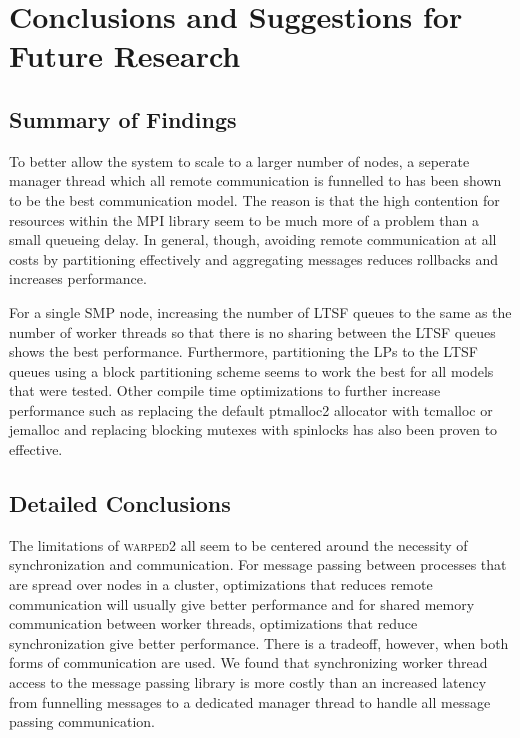 \documentclass[11pt]{book}
\begin{document}
\chapter[Conclusions \& Future Research]{Conclusions and Suggestions for Future Research}
\label{conclude}

\section{Summary of Findings}

To better allow the system to scale to a larger number of nodes, a seperate manager thread which all
remote communication is funnelled to has been shown to be the best communication model.  The
reason is that the high contention for resources within the MPI library seem to be much more
of a problem than a small queueing delay.  In general, though, avoiding remote communication at
all costs by partitioning effectively and aggregating messages reduces rollbacks and increases
performance.  

For a single SMP node, increasing the number of LTSF queues to the same as the number of worker
threads so that there is no sharing between the LTSF queues shows the best performance.  Furthermore,
partitioning the LPs to the LTSF queues using a block partitioning scheme seems to work the best
for all models that were tested.  Other compile time optimizations to further increase performance
such as replacing the default ptmalloc2 allocator with tcmalloc or jemalloc and replacing blocking
mutexes with spinlocks has also been proven to effective.

\section{Detailed Conclusions}

The limitations of \textsc{warped2} all seem to be centered around the necessity of synchronization
and communication.  For message passing between processes that are spread over nodes in a cluster,
optimizations that reduces remote communication will usually give better performance and for
shared memory communication between worker threads, optimizations that reduce synchronization
give better performance.  There is a tradeoff, however, when both forms of communication are
used.  We found that synchronizing worker thread access to the message passing library is more
costly than an increased latency from funnelling messages to a dedicated manager thread to
handle all message passing communication.
\end{document}
